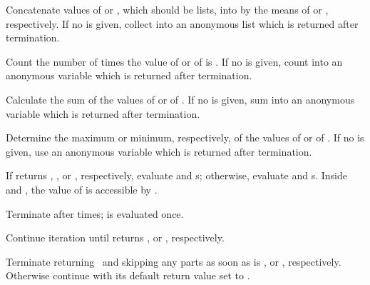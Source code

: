 \begin{LIST}{1cm}
\begin{LIST}{.5cm}
    {
    Concatenate values of  or , which should be
    lists, into  by the means of  or ,
    respectively.  If no  is given, collect into an
    anonymous list which is returned after termination. 
    }

    {
    Count the number of times the value of  or of  is \T.
    If no  is given, count into an anonymous variable
    which is returned after termination.
    }

    {
    Calculate the sum of the values of  or of .
    If no  is given, sum into an anonymous variable
    which is returned after termination.
    }

    {
    Determine the maximum or minimum, respectively, of the values of
     or of . 
    If no  is given, use an anonymous variable
    which is returned after termination.
    }

    {
    If  returns \T, \T, or \NIL, respectively, evaluate
     and s; otherwise, evaluate 
    and s. Inside  and , the value
    of  is accessible by . 
    }

    {
    Terminate  after  times;  is evaluated once.
    }

    {
    Continue iteration until  returns \NIL, or \T, respectively.
    }

    {
    Terminate  returning \NIL\ and skipping any
     parts as soon as  is \NIL, or \T,
    respectively. Otherwise continue  with its default return
    value set to \T. 
    }


\end{LIST}
\end{LIST}
